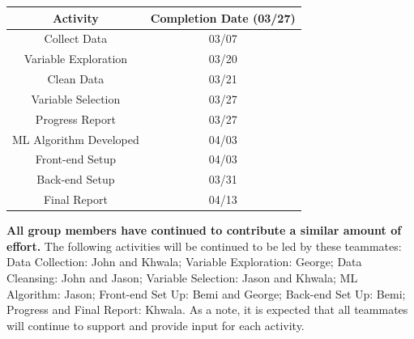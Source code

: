 \documentclass[sigconf,nonacm,11pt]{acmart}
\begin{document}
\begin{center}
    \begin{tabular}{||c|c||}
    \hline
    Activity & Completion Date (03/27)\\
    \hline\hline
    Collect Data & 03/07\\
    Variable Exploration & 03/20\\
    Clean Data & 03/21\\
    Variable Selection & 03/27\\
    Progress Report & 03/27\\
    ML Algorithm Developed & 04/03\\
    Front-end Setup & 04/03\\
    Back-end Setup & 03/31\\
    Final Report & 04/13\\
    \hline
    \end{tabular}
\end{center}

\textbf{All group members have continued to contribute a similar amount of effort.} The following activities will be continued to be led by these teammates: Data Collection: John and Khwala; Variable Exploration: George; Data Cleansing: John and Jason; Variable Selection: Jason and Khwala; ML Algorithm: Jason; Front-end Set Up: Bemi and George; Back-end Set Up: Bemi; Progress and Final Report: Khwala. As a note, it is expected that all teammates will continue to support and provide input for each activity.

\end{document}
